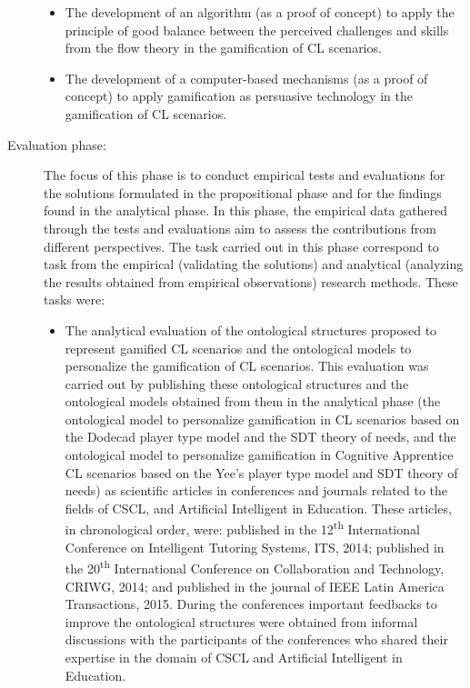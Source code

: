 \begin{description}
\begin{itemize}
\item
The development of an algorithm (as a proof of concept) to apply the principle of good balance between the perceived challenges and skills from the flow theory in the gamification of CL scenarios.

\item
The development of a computer-based mechanisms (as a proof of concept) to apply gamification as persuasive technology in the gamification of CL scenarios. 
\end{itemize}


\item[Evaluation phase:]
The focus of this phase is to conduct empirical tests and evaluations for the solutions formulated in the propositional phase and for the findings found in the analytical phase. In this phase, the empirical data gathered through the tests and evaluations aim to assess the contributions from different perspectives. The task carried out in this phase correspond to task from the empirical (validating the solutions) and analytical (analyzing the results obtained from empirical observations) research methods. These tasks were:

\begin{itemize}
\item
The analytical evaluation of the ontological structures proposed to represent gamified CL scenarios and the ontological models to personalize the gamification of CL scenarios. This evaluation was carried out by publishing these ontological structures and the ontological models obtained from them in the analytical phase (the ontological model to personalize gamification in CL scenarios based on the Dodecad player type model and the SDT theory of needs, and the ontological model to personalize gamification in Cognitive Apprentice CL scenarios based on the Yee's player type model and SDT theory of needs) as scientific articles in conferences and journals related to the fields of CSCL, and Artificial Intelligent in Education. These articles, in chronological order, were:  published in the 12\textsuperscript{th} International Conference on Intelligent Tutoring Systems, ITS, 2014;  published in the 20\textsuperscript{th} International Conference on Collaboration and Technology, CRIWG, 2014; and  published in the journal of IEEE Latin America Transactions, 2015. During the conferences important feedbacks to improve the ontological structures were obtained from informal discussions with the participants of the conferences who shared their expertise in the domain of CSCL and Artificial Intelligent in Education.


\end{itemize}
\end{description}
